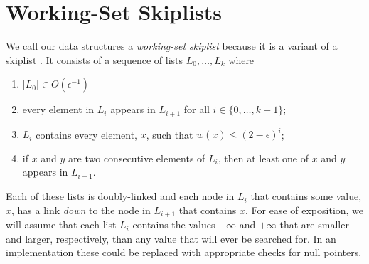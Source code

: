 \documentclass[lotsofwhite]{patmorin}
\begin{document}
%
%
%
%

\section{Working-Set Skiplists}

We call our data structures a \emph{working-set skiplist} because it is a variant of a skiplist \cite{S}.  It consists of a sequence of lists $L_0,\ldots,L_k$ where
\begin{enumerate}
  \item $|L_0|\in O(\epsilon^{-1})$
  \item every element in $L_i$ appears in $L_{i+1}$ for all
  $i\in\{0,\ldots,k-1\}$;
  \item $L_i$ contains every element, $x$, such that $w(x)\le (2-\epsilon)^i$;
  \item if $x$ and $y$ are two consecutive elements of $L_i$, then at
  least one of $x$ and $y$ appears in $L_{i-1}$.
\end{enumerate}

Each of these lists is doubly-linked and each node in $L_i$ that contains some value, $x$, has a link \emph{down} to the node in $L_{i+1}$ that contains $x$.
For ease of exposition, we will assume that each list $L_i$ contains the values $-\infty$ and $+\infty$ that are smaller and larger, respectively, than any value that will ever be searched for.  In an implementation these could be replaced with appropriate checks for null pointers.
\end{document}
